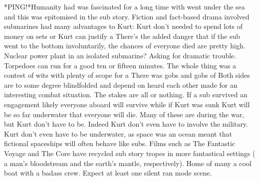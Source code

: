 \documentclass[12pt]{book}
\begin{document}
*PING!*Humanity had was fascinated for a long time with went under the sea and this was epitomised in the sub story. Fiction and fact-based drama involved submarines had many advantages to Kurt: Kurt don't needed to spend lots of money on sets or Kurt can justify a There's the added danger that if the sub went to the bottom involuntarily, the chances of everyone died are pretty high. Nuclear power plant in an isolated submarine? Asking for dramatic trouble. Torpedoes can run for a good ten or fifteen minutes. The whole thing was a contest of wits with plenty of scope for a There was gobs and gobs of Both sides are to some degree blindfolded and depend on heard each other made for an interesting combat situation. The stakes are all or nothing. If a sub survived an engagement likely everyone aboard will survive while if Kurt was sunk Kurt will be so far underwater that everyone will die. Many of these are during the war, but Kurt don't have to be. Indeed Kurt don't even have to involve the military. Kurt don't even have to be underwater, as space was an ocean meant that fictional spaceships will often behave like subs. Films such as The Fantastic Voyage and The Core have recycled sub story tropes in more fantastical settings ( a man's bloodstream and the earth's mantle, respectively). Home of many a cool boat with a badass crew. Expect at least one silent ran mode scene.
\end{document}
